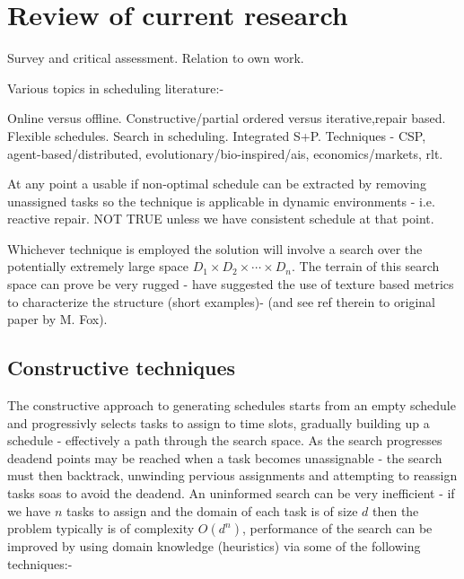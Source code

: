 \section{Review of current research}
Survey and critical assessment. Relation to own work.

Various topics in scheduling literature:-

Online versus offline. Constructive/partial ordered versus iterative,repair based. Flexible schedules.  Search in scheduling. Integrated S+P. Techniques - CSP, agent-based/distributed, evolutionary/bio-inspired/ais, economics/markets, rlt.




 At any point a usable if non-optimal schedule can be extracted by removing unassigned tasks so the technique is applicable in dynamic environments - i.e. reactive repair. NOT TRUE unless we have consistent schedule at that point.


Whichever technique is employed the solution will involve a search over the potentially extremely large space ${D_1 \times D_2 \times \cdots \times D_n}$.  The terrain of this search space can prove be very rugged - \cite{beck97texturebased} have suggested the use of texture based metrics to characterize the structure (short examples)- (and see ref therein to original paper by M. Fox). 

%
\subsection{Constructive techniques}
The constructive approach to generating schedules starts from an empty schedule and progressivly selects tasks to assign to time slots, gradually building up a schedule - effectively a path through the search space. As the search progresses deadend points may be reached when a task becomes unassignable - the search must then backtrack, unwinding pervious assignments and attempting to reassign tasks soas to avoid the deadend. An uninformed search can be very inefficient - if we have $n$ tasks to assign and the domain of each task is of size $d$ then the problem typically is of complexity $O(d^n)$, performance of the search can be improved by using domain knowledge (heuristics) via some of the following techniques:-

